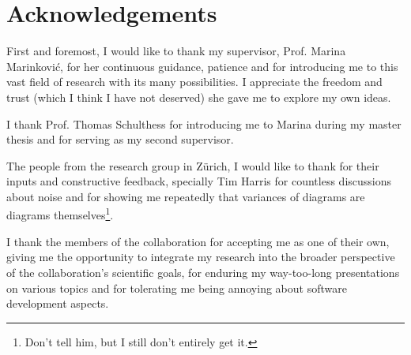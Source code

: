 
\bigskip

\begingroup
\let\clearpage\relax
\let\cleardoublepage\relax
\let\cleardoublepage\relax
\chapter*{Acknowledgements}

\def\thanks#1{%
\begingroup
\leftskip1em
\noindent #1
\par
\endgroup
}



First and foremost, I would like to thank my supervisor, Prof. Marina Marinković, for her continuous guidance, patience and for introducing me to this vast field of research with its many possibilities.
I appreciate the freedom and trust (which I think I have not deserved) she gave me to explore my own ideas.

I thank Prof. Thomas Schulthess for introducing me to Marina during my master thesis and for serving as my second supervisor.

The people from the research group in Zürich, I would like to thank for their inputs and constructive feedback, specially Tim Harris for countless discussions about noise and for showing me repeatedly that variances of diagrams are diagrams themselves\footnote{Don't tell him, but I still don't entirely get it.}.

I thank the members of the \RCstar collaboration for accepting me as one of their own, giving me the opportunity to integrate my research into the broader perspective of the collaboration's scientific goals, for enduring my way-too-long presentations on various topics and for tolerating me being annoying about software development aspects.


